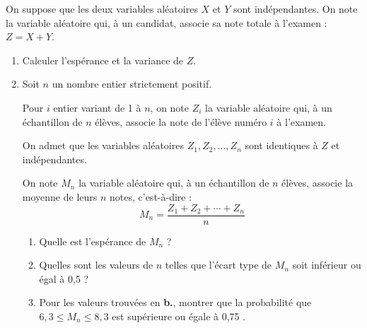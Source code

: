 \documentclass[10pt]{article}
\begin{document}
\medskip

On suppose que les deux variables aléatoires $X$ et $Y$ sont indépendantes. On note la variable aléatoire qui, à un candidat, associe sa note totale à l'examen : $Z = X + Y$.

\begin{enumerate}
\item Calculer l'espérance et la variance de $Z$.

\item Soit $n$ un nombre entier strictement positif.

Pour $i$ entier variant de 1 à $n$, on note $Z_{i}$ la variable aléatoire qui, à un échantillon de $n$ élèves, associe la note de l'élève numéro $i$ à l'examen.

On admet que les variables aléatoires $Z_{1}, Z_{2}, \ldots, Z_{n}$ sont identiques à $Z$ et indépendantes.

On note $M_{n}$ la variable aléatoire qui, à un échantillon de $n$ élèves, associe la moyenne de leurs $n$ notes, c'est-à-dire :
		$$M_{n} = \dfrac{Z_{1} + Z_{2} + \cdots + Z_{n}}{n}$$

	\begin{enumerate}
		\item Quelle est l'espérance de $M_{n}$ ?

		\item Quelles sont les valeurs de $n$ telles que l'écart type de $M_{n}$ soit inférieur ou égal à 0,5 ?

		\item Pour les valeurs trouvées en \textbf{b.}, montrer que la probabilité que $6,3 \leqslant M_{n} \leqslant 8,3$ est supérieure ou égale à 0,75 .
	\end{enumerate}
\end{enumerate}
\end{document}
